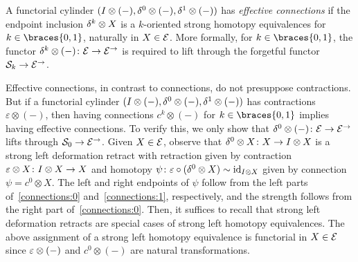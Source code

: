 \documentclass[reqno,10pt,a4paper,oneside,draft]{amsart}
\begin{document}
\begin{definition} \label{def:effective-connections}
A functorial cylinder $(I \otimes (-), \delta^0 \otimes (-), \delta^1 \otimes (-))$ has \emph{effective connections} if the endpoint inclusion $\delta^k \otimes X$ is a $k$-oriented strong homotopy equivalences for $k \in \braces{0, 1}$, naturally in $X \in \mathcal{E}$.
More formally, for $k \in \braces{0, 1}$, the functor $\delta^k \otimes (-) \colon \mathcal{E} \to \mathcal{E}^\to$ is required to lift through the forgetful functor $\mathcal{S}_k \to \mathcal{E}^\to$.
\end{definition}

\begin{remark} \label{connections-are-effective}
Effective connections, in contrast to connections, do not presuppose contractions.
But if a functorial cylinder $(I \otimes (-), \delta^0 \otimes (-), \delta^1 \otimes (-))$ has contractions $\varepsilon \otimes (-)$, then having connections $c^k \otimes (-)$ for $k \in \braces{0, 1}$ implies having effective connections.
To verify this, we only show that $\delta^0 \otimes (-) \colon \mathcal{E} \to \mathcal{E}^\to$ lifts through $\mathcal{S}_0 \to \mathcal{E}^\to$.
Given $X \in \mathcal{E}$, observe that $\delta^0 \otimes X \colon X \to I \otimes X$ is a strong left deformation retract with retraction given by contraction $\varepsilon \otimes X \colon I \otimes X \to X$ and homotopy $\psi \colon \varepsilon \mathbin{\circ} (\delta^0 \otimes X) \sim \operatorname{id}_{I \otimes X}$ given by connection $\psi = c^0 \otimes X$.
The left and right endpoints of $\psi$ follow from the left parts of~\eqref{connections:0} and~\eqref{connections:1}, respectively, and the strength follows from the right part of~\eqref{connections:0}. Then, it suffices to 
recall that strong left deformation retracts are special cases of strong left homotopy equivalences.
The above assignment of a strong left homotopy equivalence is functorial in $X \in \mathcal{E}$ since $\varepsilon \otimes (-)$ and $c^0 \otimes (-)$ are natural transformations.
\end{remark}
\end{document}
